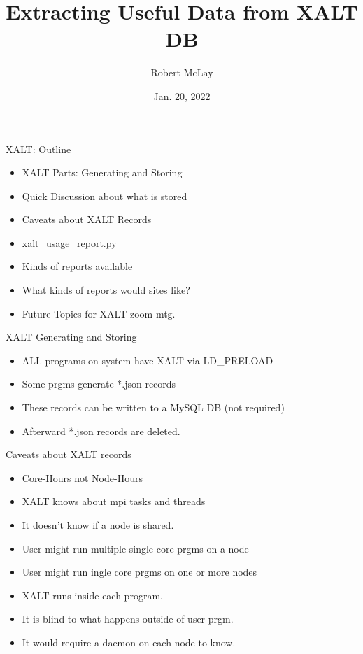 \documentclass{beamer}
\begin{document}
\title[XALT]{Extracting Useful Data from XALT DB}
\author{Robert McLay} 
\date{Jan. 20, 2022} 

\frame{\titlepage} 

\begin{frame}{XALT: Outline}
  \begin{itemize}
    \item XALT Parts: Generating and Storing
    \item Quick Discussion about what is stored
    \item Caveats about XALT Records
    \item xalt\_usage\_report.py
    \item Kinds of reports available
    \item What kinds of reports would sites like?
    \item Future Topics for XALT zoom mtg.
  \end{itemize}
\end{frame}

\begin{frame}{XALT Generating and Storing}
  \begin{itemize}
    \item ALL programs on system have XALT via LD\_PRELOAD
    \item Some prgms generate *.json records
    \item These records can be written to a MySQL DB (not required) 
    \item Afterward *.json records are deleted.
  \end{itemize}
\end{frame}

\begin{frame}{Caveats about XALT records}
  \begin{itemize}
    \item Core-Hours not Node-Hours 
    \item XALT knows about mpi tasks and threads
    \item It doesn't know if a node is shared.
    \item User might run multiple single core prgms on a node
    \item User might run ingle core prgms on one or more nodes
    \item XALT runs inside each program.
    \item It is blind to what happens outside of user prgm.
    \item It would require a daemon on each node to know.
  \end{itemize}
\end{frame}
\end{document}
